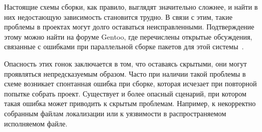 Настоящие схемы сборки, как правило, выглядят значительно сложнее, и найти в них недостающую зависимость становится трудно. В связи с этим, такие проблемы в проектах могут долго оставаться неисправленными. Подтверждение этому можно найти на форуме Gentoo, где перечислены открытые обсуждения, связанные с ошибками при параллельной сборке пакетов для этой системы~\cite{gentoo-bugzilla}.

Опасность этих гонок заключается в том, что оставаясь скрытыми, они могут проявляться непредсказуемым образом. Часто при наличии такой проблемы в схеме возникает спонтанная ошибка при сборке, которая исчезает при повторной попытке собрать проект. Существует и более опасный сценарий, при котором такая ошибка может приводить к скрытым проблемам. Например, к некорректно собранным файлам локализации или к уязвимости в распространяемом исполняемом файле.
